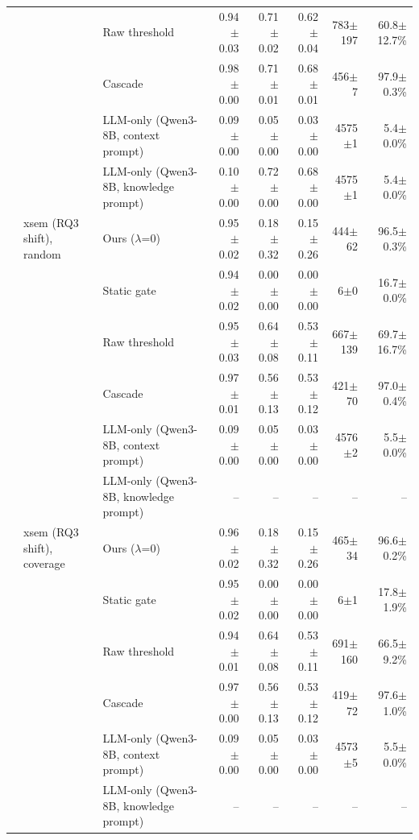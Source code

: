 {\begin{longtable}{lllrrrrr}
 &  & Raw threshold & 0.94$\pm$0.03 & 0.71$\pm$0.02 & 0.62$\pm$0.04 & 783$\pm$197 & 60.8$\pm$12.7\% \\
 &  & Cascade & 0.98$\pm$0.00 & 0.71$\pm$0.01 & 0.68$\pm$0.01 & 456$\pm$7 & 97.9$\pm$0.3\% \\
 &  & LLM-only (Qwen3-8B, context prompt) & 0.09$\pm$0.00 & 0.05$\pm$0.00 & 0.03$\pm$0.00 & 4575$\pm$1 & 5.4$\pm$0.0\% \\
 &  & LLM-only (Qwen3-8B, knowledge prompt) & 0.10$\pm$0.00 & 0.72$\pm$0.00 & 0.68$\pm$0.00 & 4575$\pm$1 & 5.4$\pm$0.0\% \\
 & xsem (RQ3 shift), random & Ours ($\lambda$=0) & 0.95$\pm$0.02 & 0.18$\pm$0.32 & 0.15$\pm$0.26 & 444$\pm$62 & 96.5$\pm$0.3\% \\
 &  & Static gate & 0.94$\pm$0.02 & 0.00$\pm$0.00 & 0.00$\pm$0.00 & 6$\pm$0 & 16.7$\pm$0.0\% \\
 &  & Raw threshold & 0.95$\pm$0.03 & 0.64$\pm$0.08 & 0.53$\pm$0.11 & 667$\pm$139 & 69.7$\pm$16.7\% \\
 &  & Cascade & 0.97$\pm$0.01 & 0.56$\pm$0.13 & 0.53$\pm$0.12 & 421$\pm$70 & 97.0$\pm$0.4\% \\
 &  & LLM-only (Qwen3-8B, context prompt) & 0.09$\pm$0.00 & 0.05$\pm$0.00 & 0.03$\pm$0.00 & 4576$\pm$2 & 5.5$\pm$0.0\% \\
 &  & LLM-only (Qwen3-8B, knowledge prompt) & -- & -- & -- & -- & -- \\
 & xsem (RQ3 shift), coverage & Ours ($\lambda$=0) & 0.96$\pm$0.02 & 0.18$\pm$0.32 & 0.15$\pm$0.26 & 465$\pm$34 & 96.6$\pm$0.2\% \\
 &  & Static gate & 0.95$\pm$0.02 & 0.00$\pm$0.00 & 0.00$\pm$0.00 & 6$\pm$1 & 17.8$\pm$1.9\% \\
 &  & Raw threshold & 0.94$\pm$0.01 & 0.64$\pm$0.08 & 0.53$\pm$0.11 & 691$\pm$160 & 66.5$\pm$9.2\% \\
 &  & Cascade & 0.97$\pm$0.00 & 0.56$\pm$0.13 & 0.53$\pm$0.12 & 419$\pm$72 & 97.6$\pm$1.0\% \\
 &  & LLM-only (Qwen3-8B, context prompt) & 0.09$\pm$0.00 & 0.05$\pm$0.00 & 0.03$\pm$0.00 & 4573$\pm$5 & 5.5$\pm$0.0\% \\
 &  & LLM-only (Qwen3-8B, knowledge prompt) & -- & -- & -- & -- & -- \\
\end{longtable}
}
